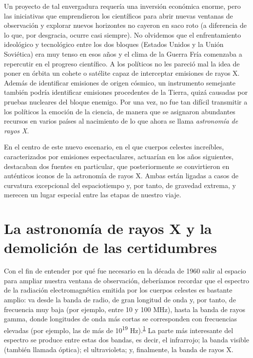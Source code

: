 Un proyecto de tal envergadura requería una inversión económica enorme, pero las iniciativas que emprendieron los científicos para abrir nuevas ventanas de observación y explorar nuevos horizontes no cayeron en saco roto (a diferencia de lo que, por desgracia, ocurre casi siempre). No olvidemos que el enfrentamiento ideológico y tecnológico entre los dos bloques (Estados Unidos y la Unión Soviética) era muy tenso en esos años y el clima de la Guerra Fría comenzaba a repercutir en el progreso científico. A los políticos no les pareció mal la idea de poner en órbita un cohete o satélite capaz de interceptar emisiones de rayos X. Además de identificar emisiones de origen cósmico, un instrumento semejante también podría identificar emisiones procedentes de la Tierra, quizá causadas por pruebas nucleares del bloque enemigo. Por una vez, no fue tan difícil transmitir a los políticos la emoción de la ciencia, de manera que se asignaron abundantes recursos en varios países al nacimiento de lo que ahora se llama \emph{astronomía de rayos X}.

En el centro de este nuevo escenario, en el que cuerpos celestes increíbles, caracterizados por emisiones espectaculares, actuarían en los años siguientes, destacaban dos fuentes en particular, que posteriormente se convirtieron en auténticos iconos de la astronomía de rayos X. Ambas están ligadas a casos de curvatura excepcional del espaciotiempo y, por tanto, de gravedad extrema, y merecen un lugar especial entre las etapas de nuestro viaje.

\section[Astronomía de rayos X]{La astronomía de rayos X y la demolición de las certidumbres}\label{sec:05-xray}

Con el fin de entender por qué fue necesario en la década de 1960 salir al espacio para ampliar nuestra ventana de observación, deberíamos recordar que el espectro de la radiación electromagnética emitida por los cuerpos celestes es bastante amplio: va desde la banda de radio, de gran longitud de onda y, por tanto, de frecuencia muy baja (por ejemplo, entre 10 y 100 MHz), hasta la banda de rayos gamma, donde longitudes de onda más cortas se corresponden con frecuencias elevadas (por ejemplo, las de más de 10\textsuperscript{19} Hz).\textsuperscript{\hyperlink{note:05-01}{1}} La parte más interesante del espectro se produce entre estas dos bandas, es decir, el infrarrojo; la banda visible (también llamada óptica); el ultravioleta; y, finalmente, la banda de rayos X.


